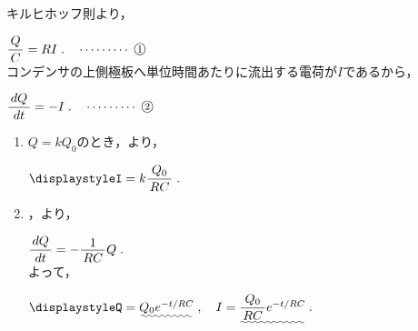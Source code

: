 ﻿\documentclass[../../../ps_a.tex]{subfiles}
\begin{document}
    キルヒホッフ則より，
    
    \myspaceb%
    $\displaystyle%
        \myfracc{Q}{C} = RI \;.\quad\cdots\cdots\cdots\;\mynumberb{1}
    $\\
    コンデンサの上側極板へ単位時間あたりに流出する電荷が$I$であるから，
    
    \myspaceb%
    $\displaystyle%
        \myfracc{dQ}{dt} = -I \;. \quad\cdots\cdots\cdots\;\mynumberb{2}
    $

    \begin{enumerate}
        \item $Q = kQ_0$のとき，より，
            
            \myspaceb%
            $\displaystyle%
                I = k \myfracc{Q_0}{RC} \;.
            $            
        \item {}，より，
            
            \myspaceb%
            $\displaystyle%
                \myfracc{dQ}{dt} = - \myfraca{1}{RC} Q \;.
            $\\
            よって，
            
            \myspaceb%
            $\displaystyle%
                Q = \uwave{Q_0 e^{-t/RC}} \;,
                \quad I = \uwave{\myfracc{Q_0}{RC} e^{-t/RC}} \;.
            $
    \end{enumerate}
\end{document}
